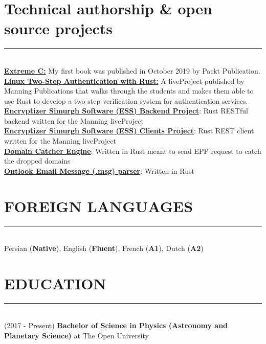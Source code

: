 \documentclass[10pt,a4paper]{article}
\begin{document}
\section{Technical authorship & open source projects}
\noindent \rule {18.0cm}{0.2pt} \\
\textbullet \hspace{0.05cm} \href{https://www.amazon.com/Extreme-Taking-Concurrency-advanced-capabilities/dp/1789343623}{\textbf{Extreme C:}} My first book was published in October 2019 by Packt Publication. \\
\textbullet \hspace{0.05cm} \href{https://www.manning.com/liveproject/linux-two-step-authentication-with-rust}{\textbf{Linux Two-Step Authentication with Rust:}} A liveProject published by Manning Publications that walks through the students and makes them able to use Rust to develop a two-step verification system for authentication services. \\
\textbullet \hspace{0.05cm} \href{https://github.com/kamcpp/ess_backend}{\textbf{Encryptizer Simurgh Software (ESS) Backend Project}}: Rust RESTful backend written for the Manning liveProject \\
\textbullet \hspace{0.05cm} \href{https://github.com/kamcpp/ess_clients}{\textbf{Encryptizer Simurgh Software (ESS) Clients Project}}: Rust REST client written for the Manning liveProject \\
\textbullet \hspace{0.05cm} \href{https://bitbucket.org/kamcpp/dcs_engine/src/master/}{\textbf{Domain Catcher Engine}}: Written in Rust meant to send EPP request to catch the dropped domains \\
\textbullet \hspace{0.05cm} \href{https://github.com/marirs/msg-parser-rs}{\textbf{Outlook Email Message (.msg) parser}}: Written in Rust \\
    
\section{FOREIGN LANGUAGES}
\noindent \rule {18.0cm}{0.2pt} \\
    Persian (\textbf{Native}), English (\textbf{Fluent}), French (\textbf{A1}), Dutch (\textbf{A2}) \\

\section{EDUCATION}
\noindent \rule {18.0cm}{0.2pt} \\
\textbullet \hspace{0.1cm} (2017 - Present)
\textbf{Bachelor of Science in Physics (Astronomy and Planetary Science)} at The Open University
\end{document}

